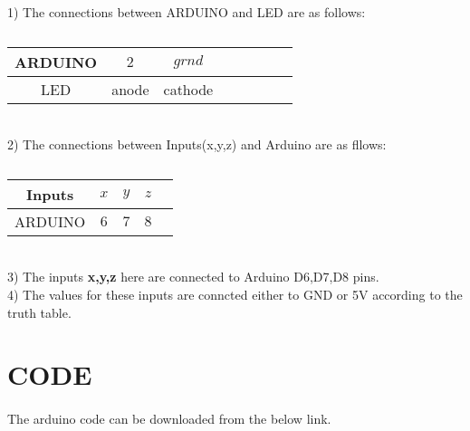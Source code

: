 \documentclass[a4paper,11pt,twocolumn]{article}
\begin{document}
1) The connections between ARDUINO and LED are as follows:
\begin{table}[ht!] 
    \centering 
    \begin{tabular}{|c|c|c|c|c|c|c|c|} 
    \hline 
       ARDUINO& $ 2$&$ grnd $\\ 
    \hline 
        LED& anode&cathode \\ 
    \hline 
    \end{tabular} 
    \caption{} 
\end{table} 
\\

2) The connections between Inputs(x,y,z) and Arduino are as fllows:
\begin{table}[ht!] 
    \centering 
    \begin{tabular}{|c|c|c|c|c|} 
    \hline 
        Inputs& $ x$ &$ y$&$ z$ \\ 
         \hline 
         ARDUINO& $ 6$& $ 7$& $ 8$ \\ 
         \hline 
    \end{tabular} 
\caption{} 
\end{table} 
\\

3) The inputs \textbf{x,y,z} here are connected to Arduino D6,D7,D8 pins.\\

4) The values for these inputs are conncted either to GND or 5V according to the truth table.\\
\section{CODE}
\paragraph{}
	The arduino code can be downloaded from the below link.
\begin{center} 
\end{center}
\end{document}

